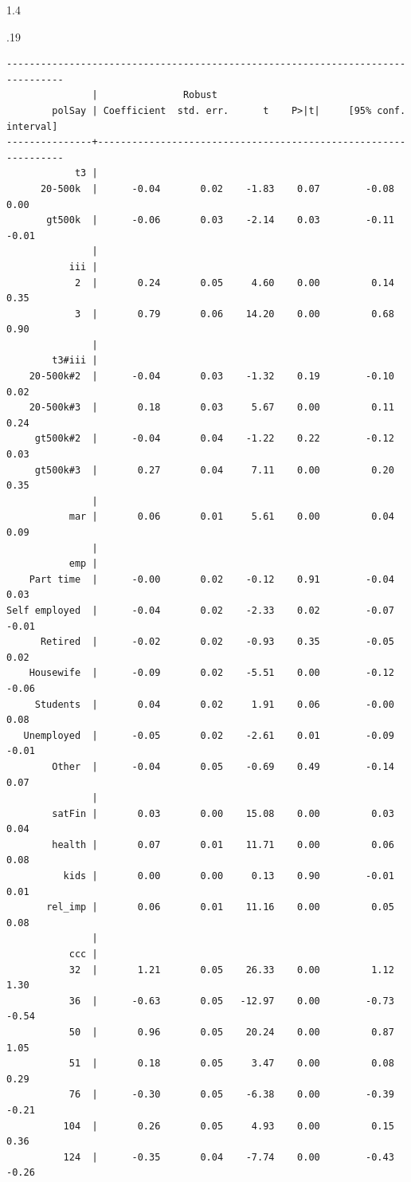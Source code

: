 \documentclass[10pt, letterpaper]{article}
\begin{document}
\begin{spacing}{1.4}
\begin{scriptsize}
\begin{spacing}{.19}
\begin{verbatim}
--------------------------------------------------------------------------------
               |               Robust
        polSay | Coefficient  std. err.      t    P>|t|     [95% conf. interval]
---------------+----------------------------------------------------------------
            t3 |
      20-500k  |      -0.04       0.02    -1.83    0.07        -0.08        0.00
       gt500k  |      -0.06       0.03    -2.14    0.03        -0.11       -0.01
               |
           iii |
            2  |       0.24       0.05     4.60    0.00         0.14        0.35
            3  |       0.79       0.06    14.20    0.00         0.68        0.90
               |
        t3#iii |
    20-500k#2  |      -0.04       0.03    -1.32    0.19        -0.10        0.02
    20-500k#3  |       0.18       0.03     5.67    0.00         0.11        0.24
     gt500k#2  |      -0.04       0.04    -1.22    0.22        -0.12        0.03
     gt500k#3  |       0.27       0.04     7.11    0.00         0.20        0.35
               |
           mar |       0.06       0.01     5.61    0.00         0.04        0.09
               |
           emp |
    Part time  |      -0.00       0.02    -0.12    0.91        -0.04        0.03
Self employed  |      -0.04       0.02    -2.33    0.02        -0.07       -0.01
      Retired  |      -0.02       0.02    -0.93    0.35        -0.05        0.02
    Housewife  |      -0.09       0.02    -5.51    0.00        -0.12       -0.06
     Students  |       0.04       0.02     1.91    0.06        -0.00        0.08
   Unemployed  |      -0.05       0.02    -2.61    0.01        -0.09       -0.01
        Other  |      -0.04       0.05    -0.69    0.49        -0.14        0.07
               |
        satFin |       0.03       0.00    15.08    0.00         0.03        0.04
        health |       0.07       0.01    11.71    0.00         0.06        0.08
          kids |       0.00       0.00     0.13    0.90        -0.01        0.01
       rel_imp |       0.06       0.01    11.16    0.00         0.05        0.08
               |
           ccc |
           32  |       1.21       0.05    26.33    0.00         1.12        1.30
           36  |      -0.63       0.05   -12.97    0.00        -0.73       -0.54
           50  |       0.96       0.05    20.24    0.00         0.87        1.05
           51  |       0.18       0.05     3.47    0.00         0.08        0.29
           76  |      -0.30       0.05    -6.38    0.00        -0.39       -0.21
          104  |       0.26       0.05     4.93    0.00         0.15        0.36
          124  |      -0.35       0.04    -7.74    0.00        -0.43       -0.26

\end{verbatim}
\end{spacing}
\end{scriptsize}
\end{spacing}
\end{document}
